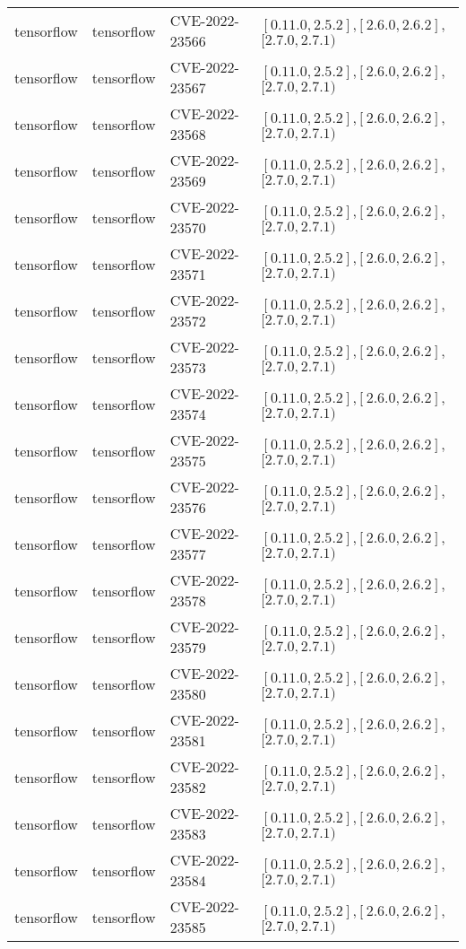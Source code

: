 \begin{tabular}{llll}
tensorflow & tensorflow & CVE-2022-23566 & $[0.11.0,2.5.2]$,$[2.6.0,2.6.2]$,$[2.7.0,2.7.1)$ \\
tensorflow & tensorflow & CVE-2022-23567 & $[0.11.0,2.5.2]$,$[2.6.0,2.6.2]$,$[2.7.0,2.7.1)$ \\
tensorflow & tensorflow & CVE-2022-23568 & $[0.11.0,2.5.2]$,$[2.6.0,2.6.2]$,$[2.7.0,2.7.1)$ \\
tensorflow & tensorflow & CVE-2022-23569 & $[0.11.0,2.5.2]$,$[2.6.0,2.6.2]$,$[2.7.0,2.7.1)$ \\
tensorflow & tensorflow & CVE-2022-23570 & $[0.11.0,2.5.2]$,$[2.6.0,2.6.2]$,$[2.7.0,2.7.1)$ \\
tensorflow & tensorflow & CVE-2022-23571 & $[0.11.0,2.5.2]$,$[2.6.0,2.6.2]$,$[2.7.0,2.7.1)$ \\
tensorflow & tensorflow & CVE-2022-23572 & $[0.11.0,2.5.2]$,$[2.6.0,2.6.2]$,$[2.7.0,2.7.1)$ \\
tensorflow & tensorflow & CVE-2022-23573 & $[0.11.0,2.5.2]$,$[2.6.0,2.6.2]$,$[2.7.0,2.7.1)$ \\
tensorflow & tensorflow & CVE-2022-23574 & $[0.11.0,2.5.2]$,$[2.6.0,2.6.2]$,$[2.7.0,2.7.1)$ \\
tensorflow & tensorflow & CVE-2022-23575 & $[0.11.0,2.5.2]$,$[2.6.0,2.6.2]$,$[2.7.0,2.7.1)$ \\
tensorflow & tensorflow & CVE-2022-23576 & $[0.11.0,2.5.2]$,$[2.6.0,2.6.2]$,$[2.7.0,2.7.1)$ \\
tensorflow & tensorflow & CVE-2022-23577 & $[0.11.0,2.5.2]$,$[2.6.0,2.6.2]$,$[2.7.0,2.7.1)$ \\
tensorflow & tensorflow & CVE-2022-23578 & $[0.11.0,2.5.2]$,$[2.6.0,2.6.2]$,$[2.7.0,2.7.1)$ \\
tensorflow & tensorflow & CVE-2022-23579 & $[0.11.0,2.5.2]$,$[2.6.0,2.6.2]$,$[2.7.0,2.7.1)$ \\
tensorflow & tensorflow & CVE-2022-23580 & $[0.11.0,2.5.2]$,$[2.6.0,2.6.2]$,$[2.7.0,2.7.1)$ \\
tensorflow & tensorflow & CVE-2022-23581 & $[0.11.0,2.5.2]$,$[2.6.0,2.6.2]$,$[2.7.0,2.7.1)$ \\
tensorflow & tensorflow & CVE-2022-23582 & $[0.11.0,2.5.2]$,$[2.6.0,2.6.2]$,$[2.7.0,2.7.1)$ \\
tensorflow & tensorflow & CVE-2022-23583 & $[0.11.0,2.5.2]$,$[2.6.0,2.6.2]$,$[2.7.0,2.7.1)$ \\
tensorflow & tensorflow & CVE-2022-23584 & $[0.11.0,2.5.2]$,$[2.6.0,2.6.2]$,$[2.7.0,2.7.1)$ \\
tensorflow & tensorflow & CVE-2022-23585 & $[0.11.0,2.5.2]$,$[2.6.0,2.6.2]$,$[2.7.0,2.7.1)$ \\

\end{tabular}
